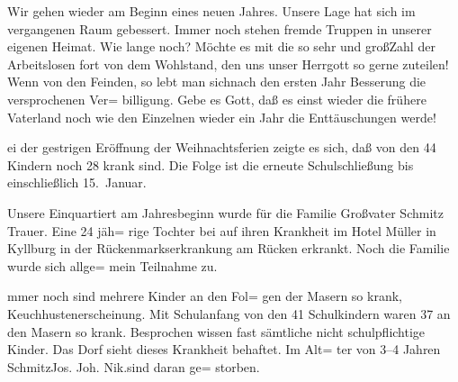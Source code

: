 

Wir gehen wieder am Beginn eines neuen\ob
Jahres. Unsere Lage hat sich im vergangenen Raum\ob
gebessert. Immer noch stehen fremde Truppen\ob
in unserer eigenen Heimat. Wie lange noch?\ob
Möchte es mit die so sehr und groß\unsicher Zahl der\ob
Arbeitslosen fort von dem Wohlstand, den uns\ob
unser Herrgott so gerne zuteilen! Wenn\ob
von den Feinden, so lebt man sich\unsicher nach den\ob
ersten Jahr Besserung die versprochenen Ver=\ob
billigung. Gebe es Gott, daß es einst wieder die\ob
frühere Vaterland noch wie den Einzelnen\ob
wieder ein Jahr die Enttäuschungen werde!

\pend
{}
\pstart

%
ei der gestrigen Eröffnung der Weihnachtsferien\ob
zeigte es sich, daß von den 44 Kindern noch 28 krank\ob
sind. Die Folge ist die erneute Schulschließung bis\ob
einschließlich 15.\ Januar.

Unsere Einquartiert am Jahresbeginn wurde\ob
für die Familie Großvater Schmitz Trauer. Eine 24 jäh=\ob
rige Tochter bei auf ihren Krankheit im Hotel\ob
Müller in Kyllburg in der Rückenmarkserkrankung am\ob
Rücken erkrankt. Noch die Familie wurde sich allge=\ob
mein Teilnahme zu.

%
mmer noch sind mehrere Kinder an den Fol=\ob
gen der Masern so krank, Keuchhustenerscheinung.\ob
Mit Schulanfang von den 41 Schulkindern\ob
waren 37 an den Masern so krank. Besprochen\ob
wissen fast sämtliche nicht schulpflichtige Kinder.\ob
Das Dorf sieht dieses Krankheit behaftet. Im Alt=\ob
ter von 3--4 Jahren Schmitz\unsicher Jos. Joh. Nik.\unsicher sind daran ge=\ob
storben.
\pend
